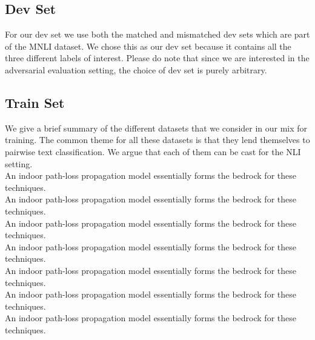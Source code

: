 \subsection{Dev Set}
\label{subsec:devset}

For our dev set we use both the matched and mismatched dev sets which are part of the MNLI dataset. We chose this as our dev set because it contains all the three different labels of interest. Please do note that since we are interested in the adversarial evaluation setting, the choice of dev set is purely arbitrary. 

\subsection{Train Set}
\label{subsec:trainset}

We give a brief summary of the different datasets that we consider in our mix for training. The common theme for all these datasets is that they lend themselves to pairwise text classification. We argue that each of them can be cast for the NLI setting. \\

 An indoor path-loss propagation model essentially forms the bedrock for these techniques.\\

 An indoor path-loss propagation model essentially forms the bedrock for these techniques.\\

 An indoor path-loss propagation model essentially forms the bedrock for these techniques.\\

 An indoor path-loss propagation model essentially forms the bedrock for these techniques.\\

 An indoor path-loss propagation model essentially forms the bedrock for these techniques.\\

 An indoor path-loss propagation model essentially forms the bedrock for these techniques.\\

 An indoor path-loss propagation model essentially forms the bedrock for these techniques.\\




